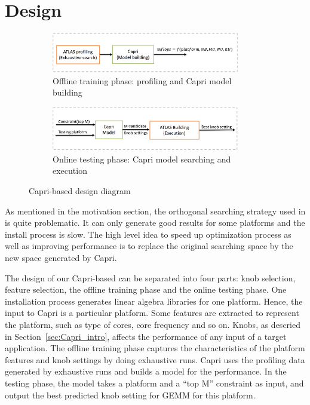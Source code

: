 \section{Design}
\label{sec:design}

\begin{figure}[tbhp]
  \centering
  \begin{subfigure}[b]{1.0\linewidth}
    \centering
    \includegraphics[width=0.9\textwidth]{images/offline_training.png}
    \caption{Offline training phase: \atl profiling and Capri model building}
    \label{fig:design_train}
  \end{subfigure}
  \begin{subfigure}[b]{1.0\linewidth}
    \centering
    \includegraphics[width=0.9\textwidth]{images/testing.png}
    \caption{Online testing phase: Capri model searching and \atl execution}
    \label{fig:design_test}
  \end{subfigure}
  \caption{Capri-based \atl design diagram}
\end{figure}

As mentioned in the motivation section, the orthogonal searching strategy used in 
\atl is quite problematic. It can only generate good results for some platforms
and the install process is slow. The high level idea to speed up \atl
optimization process as well as improving \gem performance is to replace the
original searching space by the new space generated by Capri.

The design of our Capri-based \atl can be separated into four parts: knob
selection, feature selection, the offline training phase and the online testing
phase. One \atl installation process generates linear algebra libraries for one
platform. Hence, the input to Capri is a particular platform. Some features are
extracted to represent the platform, such as type of cores, core frequency and
so on. Knobs, as descried in Section~\ref{sec:Capri_intro}, affects the
performance of any input of a target application. The offline training phase
captures the characteristics of the platform features and knob settings by doing
exhaustive runs. Capri uses the profiling data generated by exhaustive runs and
builds a model for the \gem performance. In the testing phase, the model takes
a platform and a ``top M'' constraint as input, and output the best predicted
knob setting for GEMM for this platform.

